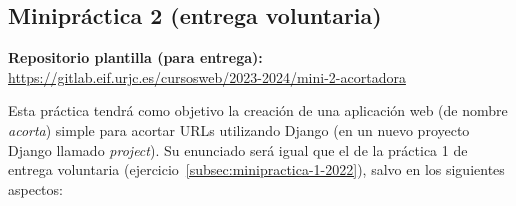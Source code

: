 \subsection{Minipráctica 2 (entrega voluntaria)}
\label{subsec:minipractica-2-2024}

\textbf{Repositorio plantilla (para entrega):} \\
\url{https://gitlab.eif.urjc.es/cursosweb/2023-2024/mini-2-acortadora}

Esta práctica tendrá como objetivo la creación de una aplicación web (de nombre \emph{acorta}) simple para acortar URLs utilizando Django (en un nuevo proyecto Django llamado \emph{project}). Su enunciado será igual que el de la práctica 1 de entrega voluntaria (ejercicio~\ref{subsec:minipractica-1-2022}), salvo en los siguientes aspectos:


